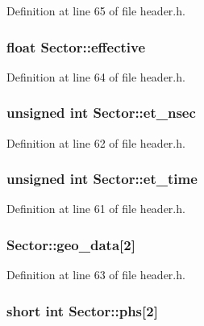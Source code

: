 Definition at line 65 of file header.h.\hypertarget{structSector_a238bb7d9c9c014f78f2fe414c2d29682}{
\subsubsection[{effective}]{\setlength{\rightskip}{0pt plus 5cm}float {\bf Sector::effective}}}
\label{structSector_a238bb7d9c9c014f78f2fe414c2d29682}


Definition at line 64 of file header.h.\hypertarget{structSector_ab7448a02f911a225f1f59fdd418b5d51}{
\subsubsection[{et\_\-nsec}]{\setlength{\rightskip}{0pt plus 5cm}unsigned int {\bf Sector::et\_\-nsec}}}
\label{structSector_ab7448a02f911a225f1f59fdd418b5d51}


Definition at line 62 of file header.h.\hypertarget{structSector_aec5d4f9bb6f5c758e8cb7352ad709877}{
\subsubsection[{et\_\-time}]{\setlength{\rightskip}{0pt plus 5cm}unsigned int {\bf Sector::et\_\-time}}}
\label{structSector_aec5d4f9bb6f5c758e8cb7352ad709877}


Definition at line 61 of file header.h.\hypertarget{structSector_a11562260b4d531715bd3d1b7349b58be}{
\subsubsection[{geo\_\-data}]{ {\bf Sector::geo\_\-data}\mbox{[}2\mbox{]}}}
\label{structSector_a11562260b4d531715bd3d1b7349b58be}


Definition at line 63 of file header.h.\hypertarget{structSector_abca4d958bc9375efad849c623aaf9e19}{
\subsubsection[{phs}]{\setlength{\rightskip}{0pt plus 5cm}short int {\bf Sector::phs}\mbox{[}2\mbox{]}}}
\label{structSector_abca4d958bc9375efad849c623aaf9e19}


